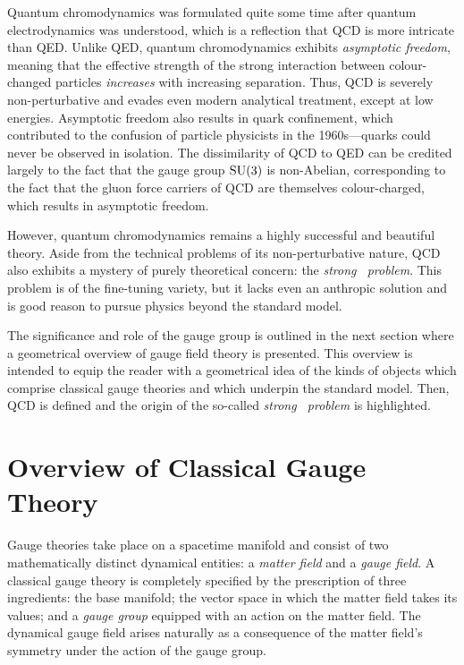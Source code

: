 Quantum chromodynamics was formulated quite some time after quantum electrodynamics was understood, which is a reflection that QCD is more intricate than QED.
Unlike QED, quantum chromodynamics exhibits \emph{asymptotic freedom}, meaning that the effective strength of the strong interaction between colour-changed particles \emph{increases} with increasing separation.
Thus, QCD is severely non-perturbative and evades even modern analytical treatment, except at low energies.
Asymptotic freedom also results in quark confinement, which contributed to the confusion of particle physicists in the 1960s---quarks could never be observed in isolation.
The dissimilarity of QCD to QED can be credited largely to the fact that the gauge group $\mathrm{SU}(3)$ is non-Abelian, corresponding to the fact that the gluon force carriers of QCD are themselves colour-charged, which results in asymptotic freedom.

However, quantum chromodynamics remains a highly successful and beautiful theory.
Aside from the technical problems of its non-perturbative nature, QCD also exhibits a mystery of purely theoretical concern: the \emph{strong \CP\ problem}.
This problem is of the fine-tuning variety, but it lacks even an anthropic solution and is good reason to pursue physics beyond the standard model.


The significance and role of the gauge group is outlined in the next section where a geometrical overview of gauge field theory is presented.
This overview is intended to equip the reader with a geometrical idea of the kinds of objects which comprise classical gauge theories and which underpin the standard model.
Then, QCD is defined and the origin of the so-called \emph{strong \CP\ problem} is highlighted.



\section{Overview of Classical Gauge Theory}
\label{sec:overview-of-gauge-theory}

Gauge theories take place on a spacetime manifold and consist of two mathematically distinct dynamical entities: a \emph{matter field} and a \emph{gauge field}.
A classical gauge theory is completely specified by the prescription of three ingredients: the base manifold; the vector space in which the matter field takes its values; and a \emph{gauge group} equipped with an action on the matter field.
The dynamical gauge field arises naturally as a consequence of the matter field's symmetry under the action of the gauge group.

